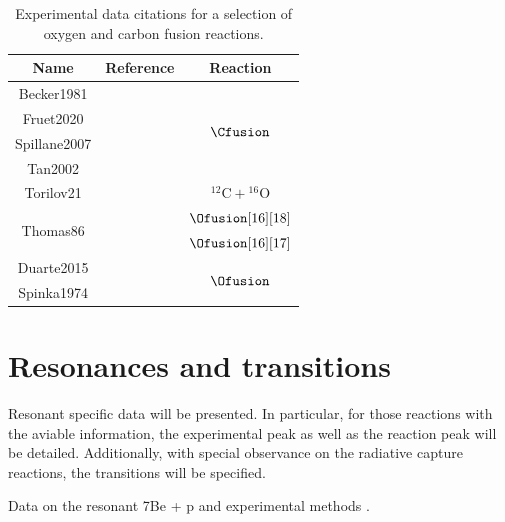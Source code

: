 \documentclass[openany]{book}
\begin{document}
 
\begin{table}[H]
	\centering
	\begin{tabular}{|c|c|c|}
		\hline
		Name & Reference & Reaction \\ \hline
		Becker1981 &   \cite{becker_kettner_rolfs_trautvetter_1981}  &    \multirow{4}{*}{$\Cfusion$} \\ \cline{1-2}
		Fruet2020 &  \cite{fruet_courtin_heine_jenkins_adsley_brown_canavan_catford_charon_curien_et_2020}          & \\ \cline{1-2}
		Spillane2007 &   \cite{spillane_raiola_rolfs_schurmann_strieder_zeng_becker_bordeanu_gialanella_romano_et_2007}  &   \\ \cline{1-2}
		Tan2002 &    \cite{tan_boeltzig_dulal_deboer_frentz_henderson_howard_kelmar_kolata_long_et_2020}  & \\ \hline
		Torilov21  &  \cite{torilov_maltsev_zherebchevsky_2021}     & $\mathrm{{}^{12}C + {}^{16}O}$       \\ \hline
		\multirow{2}{*}{Thomas86} & \multirow{2}{*}{  \cite{thomas_chen_hinds_meredith_olson_1986} }  &     $\Ofusion[16][18]$  \\ \cline{3-3} 
	 	 &  &     $\Ofusion[16][17]$ \\ \hline
		Duarte2015  &   \cite{duarte_gasques_oliveira_zagatto_chamon_medina_added_seale_alcantara-nunez_rossi_et_2015} & \multirow{2}{*}{ $\Ofusion$}  \\ \cline{1-2} 
		Spinka1974   &  \cite{spinka_winkler_1974}  &  \\ \hline
	\end{tabular}
	\caption[References oxygen and carbon fusion experimental data]{Experimental data citations for a selection of oxygen and carbon fusion reactions.}
\label{table:fusion}
\end{table}
 
\section{Resonances and transitions} \label{sec:resonancesTransitions}

Resonant specific data will be presented. In particular, for those reactions with the aviable information, the experimental peak as well as the reaction peak will be detailed. Additionally, with special observance on the radiative capture reactions, the transitions will be specified.

Data on the resonant 7Be + p and experimental methods \cite{buompane_dileva_gialanella_d'onofrio_decesare_duarte_fulop_gasques_gyurky_morales-gallegos_et_2022}.
\end{document}
